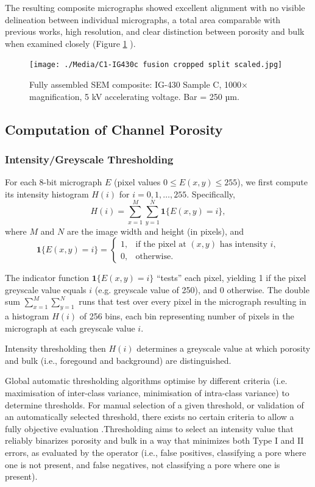 \documentclass[3p,twocolumn]{elsarticle}
\begin{document}
The resulting composite micrographs showed excellent alignment with no visible
delineation between individual micrographs, a total area comparable with
previous works, high resolution, and clear distinction between porosity and bulk
when examined closely (Figure \ref{fig:IG430C split scaled}
\cite{Huang2019,Kane2011a}). 

	\begin{figure}
		\centering
		\texttt{[image: ./Media/C1-IG430c fusion cropped split scaled.jpg]}
		\caption{Fully assembled SEM composite: IG-430 Sample C, 1000×  magnification,
     5 kV accelerating voltage. Bar = 250 µm.}
		\label{fig:IG430C split scaled}
	\end{figure} 

	\subsection{Computation of Channel Porosity}
\subsubsection{Intensity/Greyscale Thresholding}

For each 8-bit micrograph \(E\) (pixel values \(0 \le E(x,y) \le 255\)), we
first compute its intensity histogram \(H(i)\) for \(i=0,1,\dots,255\).
Specifically,
\[
H(i) = \sum_{x=1}^{M}\sum_{y=1}^{N} \mathbf{1}\{E(x,y)=i\},
\]
where \(M\) and \(N\) are the image width and height (in pixels), and
\[
\mathbf{1}\{E(x,y)=i\} =
\begin{cases}
1, & \text{if the pixel at }(x,y)\text{ has intensity }i,\\
0, & \text{otherwise.}
\end{cases}
\]

The indicator function \(\mathbf{1}\{E(x,y)=i\}\) “tests” each pixel, yielding 1
if the pixel greyscale value equals \(i\) (e.g. greyscale value of 250), and 0
otherwise. The double sum \(\sum_{x=1}^M\sum_{y=1}^N\) runs that test over every
pixel in the micrograph resulting in a histogram \(H(i)\) of 256 bins, each bin
representing number of pixels in the micrograph at each greyscale value \(i\). 

Intensity thresholding then \(H(i)\) determines a greyscale value
at which porosity and bulk (i.e., foregound and background) are distinguished.

Global automatic thresholding algorithms optimise by different
criteria (i.e. maximisation of inter-class variance, minimisation of
intra-class variance) to determine thresholds. For manual selection of a given
threshold, or validation of an automatically selected threshold, there exists
no certain criteria to allow a fully objective evaluation
\citep{Huang2019}.Thresholding aims to select an intensity value that reliably
binarizes porosity and bulk in a way that minimizes both Type I and II errors,
as evaluated by the operator (i.e., false positives, classifying a pore where
one is not present, and false negatives, not classifying a pore where one is
present).
\end{document}
